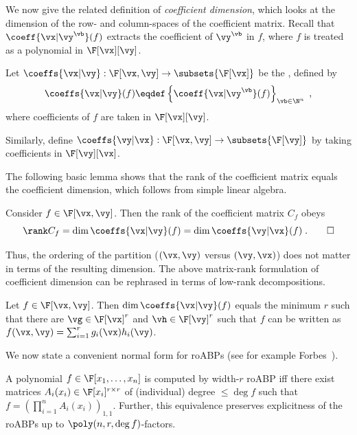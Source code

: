 \documentclass{toc}
\begin{document}
We now give the related definition of \emph{coefficient dimension}, which looks at the dimension of the row- and column-spaces of the coefficient matrix. Recall that $\coeff{\vx|\vy^\vb}(f)$ extracts the coefficient of $\vy^\vb$ in $f$, where $f$ is treated as a polynomial in $\F[\vx][\vy]$.

\begin{definition}\label{defn:coefficient-space}
        Let $\coeffs{\vx|\vy}:\F[\vx,\vy]\to\subsets{\F[\vx]}$ be the , defined by
        \[
                \coeffs{\vx|\vy}(f)
                \eqdef
                \left\{
                        \coeff{\vx|\vy^\vb}(f)
                \right\}_{\vb\in\N^n}
                \;,
        \]
        where coefficients of $f$ are taken in $\F[\vx][\vy]$.

        Similarly, define $\coeffs{\vy|\vx}:\F[\vx,\vy]\to\subsets{\F[\vy]}$ by taking coefficients in $\F[\vy][\vx]$.
\end{definition}

The following basic lemma shows that the rank of the coefficient matrix equals the coefficient dimension, which follows from simple linear algebra.

\begin{lemmawp}\label{res:y-dim_eq-x-dim}
        Consider $f\in\F[\vx,\vy]$.  Then the rank of the coefficient matrix $C_f$ obeys
        \[
                \rank C_f
                =
                \dim\coeffs{\vx|\vy}(f)=\dim\coeffs{\vy|\vx}(f)
                \;.
                \qedhere
        \]
\end{lemmawp}

Thus, the ordering of the partition ($(\vx,\vy)$ versus $(\vy,\vx)$) does not matter in terms of the resulting dimension. The above matrix-rank formulation of coefficient dimension can be rephrased in terms of low-rank decompositions.

\begin{lemmawp}\label{res:nisan_dim-eq-width}
        Let $f\in\F[\vx,\vy]$. Then $\dim\coeffs{\vx|\vy}(f)$ equals the minimum $r$ such that there are $\vg\in\F[\vx]^r$ and $\vh\in\F[\vy]^r$ such that $f$ can be written as $f(\vx,\vy)=\sum_{i=1}^r g_i(\vx)h_i(\vy)$.
\end{lemmawp}

We now state a convenient normal form for roABPs (see for example Forbes~\cite[Corollary 4.4.2]{Forbes14}).

\begin{lemmawp}\label{res:roABP-normal-form}
        A polynomial $f\in\F[x_1,\ldots,x_n]$ is computed by width-$r$ roABP iff there exist matrices $A_i(x_{i})\in\F[x_{i}]^{r\times r}$ of (individual) degree $\le \deg f$ such that $f=(\prod_{i=1}^n A_i(x_{i}))_{1,1}$. Further, this equivalence preserves explicitness of the roABPs up to $\poly(n,r,\deg f)$-factors.
\end{lemmawp}
\end{document}
